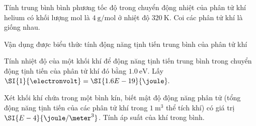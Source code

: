 \begin{vd}
	Tính trung bình bình phương tốc độ trong chuyển động nhiệt của phân tử khí helium có khối lượng mol là $\SI{4}{\gram/\mole}$ ở nhiệt độ $\SI{320}{\kelvin}$. Coi các phân tử khí là giống nhau.
\end{vd}
\newpage
\begin{dang}{Vận dụng được biểu thức tính động năng tịnh tiến trung bình của phân tử khí}
\end{dang}
\begin{vd}
	Tính nhiệt độ của một khối khí để động năng tịnh tiến trung bình trong chuyển động tịnh tiến của phân tử khí đó bằng $\SI{1.0}{\electronvolt}$. Lấy $\SI{1}{\electronvolt}=\SI{1.6E-19}{\joule}.$
\end{vd}
\begin{vd}
	Xét khối khí chứa trong một bình kín, biết mật độ động năng phân tử (tổng động năng tịnh tiến của các phân tử khí trong $\SI{1}{\meter^3}$ thể tích khí) có giá trị $\SI{E-4}{\joule/\meter^3}$. Tính áp suất của khí trong bình.
\end{vd}
